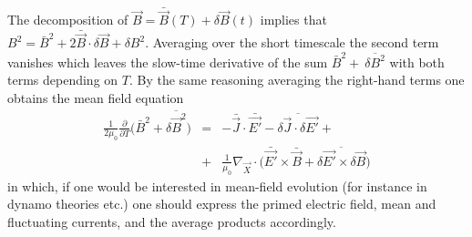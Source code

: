 \documentclass[ ]{copernicus2}
\begin{document}
{{{{The decomposition of $\vec{B}=\bar{\vec{B}}(T)+\delta\vec{B}(t)$ implies that $B^2=\bar{{B}}^2+2\bar{\vec{B}}\cdot\delta\vec{B}+\delta{B}^2$. Averaging over the short timescale the second term vanishes which leaves the slow-time derivative of the sum $\bar{B}^2+\ \overline{\delta{B}^2}$ with both terms depending on $T$. By the same reasoning averaging the right-hand terms one obtains the mean field equation
\begin{eqnarray}
\frac{1}{2\mu_0}\frac{\partial}{\partial T}\Big(\bar{B}^2+\overline{\delta\vec{B}^2}\Big)&=& -\bar{\vec{J}}\cdot\bar{\vec{E'}}-
\overline{\delta\vec{J}\cdot\delta\vec{E'}} +\nonumber\\&+&\frac{1}{\mu_0}\nabla_{\vec{X}}\cdot\Big(\bar{\vec{E'}}\times\bar{\vec{B}}+\overline{\delta\vec{E'}\times\delta\vec{B}}\Big)\nonumber
\end{eqnarray}
in which, if one would be interested in mean-field evolution (for instance in dynamo theories etc.) one should express the primed electric field, mean and fluctuating currents, and the average products accordingly. }

}}}
\end{document}
